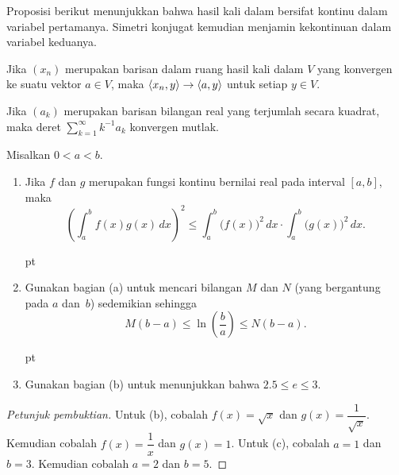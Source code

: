 Proposisi berikut menunjukkan bahwa hasil kali dalam bersifat kontinu dalam variabel pertamanya. Simetri konjugat kemudian menjamin
kekontinuan dalam variabel keduanya.

\begin{prop} Jika $(x_n)$ merupakan barisan dalam ruang hasil kali dalam $V$ yang konvergen ke suatu
vektor $a \in V$, maka $\langle x_n,y \rangle \rightarrow \langle a,y \rangle$ untuk setiap $y \in V$.
\end{prop}

\begin{exam} Jika $(a_k)$ merupakan barisan bilangan real yang terjumlah secara kuadrat, maka deret $\sum_{k=1}^\infty k^{-1}a_k$
konvergen mutlak.
\end{exam}

\begin{exer} Misalkan $0 < a < b$.
 \begin{enumerate}
  \item Jika $f$ dan $g$ merupakan fungsi kontinu bernilai real pada
interval $[a,b]$, maka
   \[\left(\int_a^b f(x)g(x)\,dx\right)^2
             \le \int_a^b\bigl(f(x)\bigr)^2\,dx \cdot
                       \int_a^b\bigl(g(x)\bigr)^2\,dx.\]

 pt

  \item Gunakan bagian (a) untuk mencari bilangan $M$ dan $N$ (yang bergantung pada $a$
dan~$b$) sedemikian sehingga
   \[M(b-a) \le \ln\left(\frac ba\right) \le N(b-a).\]

 pt

  \item Gunakan bagian (b) untuk menunjukkan bahwa $2.5 \le e \le 3$.
 \end{enumerate}
\end{exer}

\begin{proof}[\emph{Petunjuk pembuktian}] Untuk (b), cobalah $f(x) = \sqrt x$ dan $g(x) = \dfrac1{\sqrt x}$. Kemudian cobalah
$f(x) = \dfrac1x$ dan $g(x) = 1$. Untuk (c), cobalah $a = 1$ dan $b = 3$. Kemudian cobalah $a = 2$ dan $b = 5$. \ns
\end{proof}

